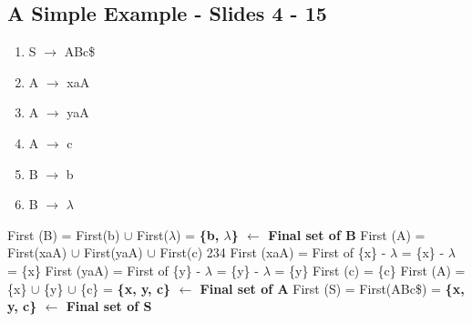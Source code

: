 \documentclass{report}
\begin{document}
\subsection{A Simple Example - Slides 4 - 15}
\vspace{-1.5em}
\begin{multicols}{2}
  \begin{enumerate}
    \setlength\itemsep{-.25em}
    \item S $\rightarrow$ ABc\$
    \item A $\rightarrow$ xaA
    \item A $\rightarrow$ yaA
    \item A $\rightarrow$ c
    \item B $\rightarrow$ b
    \item B $\rightarrow$ $\lambda$\newline\newline\newline\newline
  \end{enumerate}
  \setlength{\leftskip}{-12em}
  First (B) = First(b) $\cup$  First($\lambda$) = \textbf{ \{b, $\lambda$\}  $\leftarrow$ Final set of B}\newline
  First (A) = First(xaA) $\cup$ First(yaA) $\cup$ First(c)\newline
  \indent\hspace{2cm}2\hspace{5.5em}3\hspace{5.5em}4\newline
  \indent\hspace{.25cm}First (xaA) = First of \{x\} - $\lambda$ = \{x\} - $\lambda$ = \{x\}\newline
  \indent\hspace{.25cm}First (yaA) = First of \{y\} - $\lambda$ = \{y\} - $\lambda$ = \{y\}\newline
  \indent\hspace{.25cm}First (c) = \{c\}\newline
  First (A) = \{x\} $\cup$ \{y\} $\cup$ \{c\} = \textbf{ \{x, y, c\} $\leftarrow$ Final set of A}\newline
  First (S) = First(ABc\$) = \textbf{ \{x, y, c\} $\leftarrow$ Final set of S}
  \\
\end{multicols}

\vspace{-3em}
\end{document}

